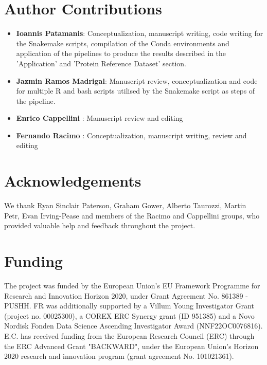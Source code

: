 \documentclass[twocolumn,showpacs,%
  nofootinbib,aps,superscriptaddress,%
  eqsecnum,prd,notitlepage,showkeys,10pt]{report}
\begin{document}
\section{Author Contributions}
\begin{itemize}	
\item \textbf{Ioannis Patamanis}: Conceptualization, manuscript writing, code writing for the Snakemake scripts, compilation of the Conda environments and application of the pipelines to produce the results described in the 'Application' and 'Protein Reference Dataset' section.
\item \textbf{Jazmin Ramos Madrigal}: Manuscript review, conceptualization and code for multiple R and bash scripts utilised by the Snakemake script as steps of the pipeline.
\item \textbf{Enrico Cappellini} : Manuscript review and editing
\item \textbf{Fernando Racimo} : Conceptualization, manuscript writing, review and editing
\end{itemize}



\paragraph{}

\section{Acknowledgements}
We thank Ryan Sinclair Paterson, Graham Gower, Alberto Taurozzi, Martin Petr, Evan Irving-Pease and members of the Racimo and Cappellini groups, who provided valuable help and feedback throughout the project.

\paragraph{}

\section{Funding}
The project was funded by the European Union's EU Framework Programme for Research and Innovation Horizon 2020, under Grant Agreement No. 861389 - PUSHH. FR was additionally supported by a Villum Young Investigator Grant (project no. 00025300), a COREX ERC Synergy grant (ID 951385)
and a Novo Nordisk Fonden Data Science Ascending Investigator Award (NNF22OC0076816). E.C. has received funding from the European Research Council (ERC) through the ERC Advanced Grant "BACKWARD", under the European Union’s Horizon 2020 research and innovation program (grant agreement No. 101021361).
\end{document}
